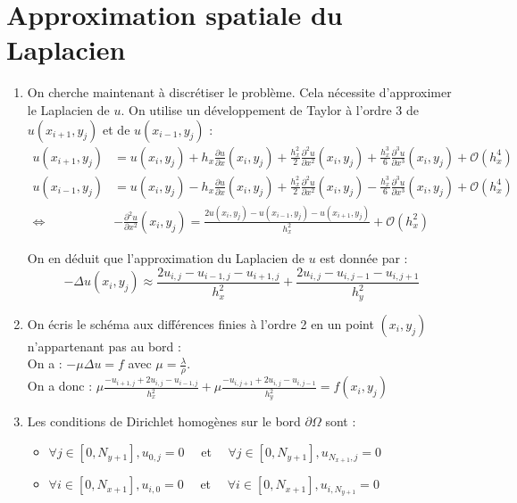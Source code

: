 \documentclass[12pt,a4paper]{article}
\begin{document}
\section*{Approximation spatiale du Laplacien}
\begin{enumerate}[resume]

    \item On cherche maintenant à discrétiser le problème. Cela nécessite d'approximer le Laplacien de $u$.
    On utilise un développement de Taylor à l'ordre 3 de $u(x_{i+1}, y_j)$ et de $u(x_{i-1}, y_j)$ :
    \begin{align*}
        u(x_{i+1}, y_j) &= u(x_i, y_j) + h_x \frac{\partial u}{\partial x}(x_i, y_j) + \frac{h_x^2}{2} \frac{\partial^2 u}{\partial x^2}(x_i, y_j) + \frac{h_x^3}{6} \frac{\partial^3 u}{\partial x^3}(x_i, y_j) + \mathcal{O}(h_x^4) \\
        u(x_{i-1}, y_j) &= u(x_i, y_j) - h_x \frac{\partial u}{\partial x}(x_i, y_j) + \frac{h_x^2}{2} \frac{\partial^2 u}{\partial x^2}(x_i, y_j) - \frac{h_x^3}{6} \frac{\partial^3 u}{\partial x^3}(x_i, y_j) + \mathcal{O}(h_x^4) \\
        \Leftrightarrow \quad & -\frac{\partial^2 u}{\partial x^2}(x_i, y_j) = \frac{2u(x_i, y_j) - u(x_{i-1}, y_j) - u(x_{i+1}, y_j)}{h_x^2} + \mathcal{O}(h_x^2)
    \end{align*}

    On en déduit que l'approximation du Laplacien de $u$ est donnée par :
    $$
    - \Delta u(x_i, y_j) \approx \frac{2u_{i,j} - u_{i-1,j} - u_{i+1,j}}{h_x^2} + \frac{2u_{i,j} - u_{i,j-1} - u_{i,j+1}}{h_y^2}
    $$

    \item On écris le schéma aux différences finies à l'ordre 2 en un point $(x_i, y_j)$ n'appartenant pas au bord : \\
    On a : $- \mu \Delta u = f$ avec $\mu = \frac{\lambda}{\rho}$. \\
    On a donc : $\mu \frac{-u_{i+1, j} + 2u_{i,j} - u_{i-1,j}}{h_x^2} + \mu \frac{-u_{i, j+1} + 2u_{i,j} - u_{i,j-1}}{h_y^2} = f(x_i, y_j)$\\

    \item Les conditions de Dirichlet homogènes sur le bord $\partial \Omega$ sont :
    \begin{itemize}
        \item $\forall j \in [0, N_{y+1}], u_{0, j} = 0 \quad$ et $\quad \forall j \in [0, N_{y+1}], u_{N_{x+1}, j} = 0$
        \item $\forall i \in [0, N_{x+1}], u_{i, 0} = 0 \quad$ et $\quad \forall i \in [0, N_{x+1}], u_{i, N_{y+1}} = 0$
    \end{itemize}


\end{enumerate}
\end{document}
